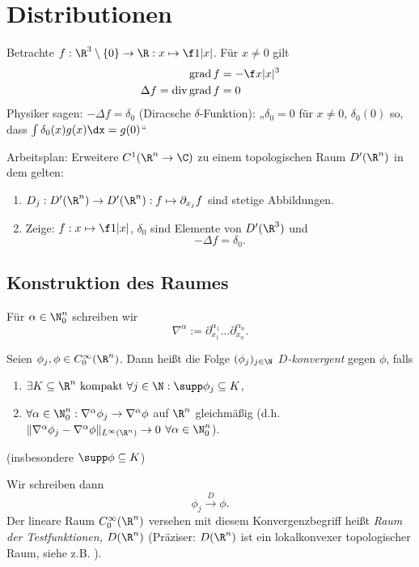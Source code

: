 
\chapter{Distributionen}


Betrachte $f : \R^3 \setminus \{0\} \to \R : x \mapsto \f 1{|x|}$.
Für $x \neq 0$ gilt
\begin{align*}
	\grad f &= - \f x{|x|^3} \\
	\Delta f = \div \grad f &= 0
\end{align*}
Physiker sagen: $-\Delta f = \delta_0$ (Diracsche $\delta$-Funktion):
„$\delta_0 = 0$ für $x \neq 0$, $\delta_0(0)$ so, dass $\int \delta_0(x)g(x) \dx = g(0)$“

Arbeitsplan: Erweitere $C^1(\R^n \to \C)$ zu einem topologischen Raum $D'(\R^n)$ in dem gelten:
\begin{enumerate}[1)]
	\item
		$D_j : D'(\R^n) \to D'(\R^n) : f \mapsto \partial_{x_j} f$ sind stetige Abbildungen.
	\item
		Zeige: $f : x \mapsto \f 1{|x|}$, $\delta_0$ sind Elemente von $D'(\R^3)$ und
		\[
			-\Delta f = \delta_0.
		\]
\end{enumerate}


\section{Konstruktion des Raumes}


\begin{conv} \label{5.1}
	Für $\alpha \in \N_0^n$ schreiben wir
	\[
		\nabla^\alpha := \partial_{x_1}^{\alpha_1} \dotso \partial_{x_n}^{\alpha_n}.
	\]
\end{conv}

\begin{df} \label{5.2}
	Seien $\phi_j, \phi \in C_0^\infty(\R^n)$.
	Dann heißt die Folge $(\phi_j)_{j\in \N}$ \emph{$D$-konvergent} gegen $\phi$, falls
	\begin{enumerate}[1)]
		\item
			$\exists K \subset \R^n \text{ kompakt } \forall j \in \N: \supp \phi_j \subset K$,
		\item
			$\forall \alpha \in \N_0^n: \nabla^{\alpha} \phi_j \to \nabla^\alpha \phi$ auf $\R^n$ gleichmäßig (d.h. $\|\nabla^\alpha \phi_j - \nabla^\alpha \phi\|_{L^\infty(\R^n)} \to 0$ $\forall \alpha \in \N_0^n$).
	\end{enumerate}
	(insbesondere $\supp \phi \subset K$)

	Wir schreiben dann
	\[
		\phi_j \overset{D} \longrightarrow \phi.
	\]
	Der lineare Raum $C_0^\infty(\R^n)$ versehen mit diesem Konvergenzbegriff heißt \emph{Raum der Testfunktionen, $D(\R^n)$}  (Präziser: $D(\R^n)$  ist ein lokalkonvexer topologischer Raum, siehe z.B. \cite{Reed-Simon}).
\end{df}

